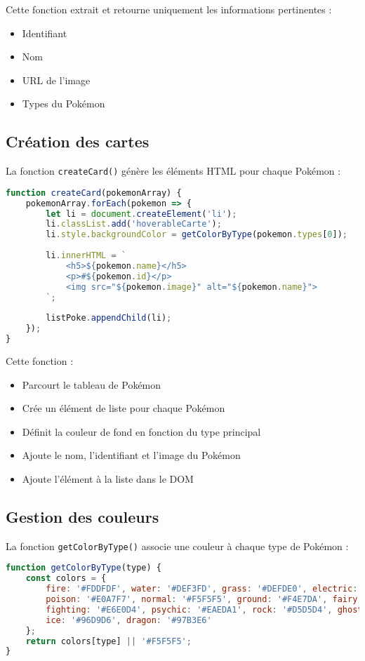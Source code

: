 \documentclass{article}
\begin{document}
Cette fonction extrait et retourne uniquement les informations pertinentes :
\begin{itemize}
    \item Identifiant
    \item Nom
    \item URL de l'image
    \item Types du Pokémon
\end{itemize}

\subsection{Création des cartes}
La fonction \texttt{createCard()} génère les éléments HTML pour chaque Pokémon :

\begin{lstlisting}[language=JavaScript]
function createCard(pokemonArray) {
    pokemonArray.forEach(pokemon => {
        let li = document.createElement('li');
        li.classList.add('hoverableCarte');
        li.style.backgroundColor = getColorByType(pokemon.types[0]);
        
        li.innerHTML = `
            <h5>${pokemon.name}</h5>
            <p>#${pokemon.id}</p>
            <img src="${pokemon.image}" alt="${pokemon.name}">
        `;
        
        listPoke.appendChild(li);
    });
}
\end{lstlisting}

Cette fonction :
\begin{itemize}
    \item Parcourt le tableau de Pokémon
    \item Crée un élément de liste pour chaque Pokémon
    \item Définit la couleur de fond en fonction du type principal
    \item Ajoute le nom, l'identifiant et l'image du Pokémon
    \item Ajoute l'élément à la liste dans le DOM
\end{itemize}

\subsection{Gestion des couleurs}
La fonction \texttt{getColorByType()} associe une couleur à chaque type de Pokémon :

\begin{lstlisting}[language=JavaScript]
function getColorByType(type) {
    const colors = {
        fire: '#FDDFDF', water: '#DEF3FD', grass: '#DEFDE0', electric: '#FCF7DE', bug: '#F8D5A3',
        poison: '#E0A7F7', normal: '#F5F5F5', ground: '#F4E7DA', fairy: '#FCEAFF',
        fighting: '#E6E0D4', psychic: '#EAEDA1', rock: '#D5D5D4', ghost: '#705898',
        ice: '#96D9D6', dragon: '#97B3E6'
    };
    return colors[type] || '#F5F5F5';
}
\end{lstlisting}
\end{document}
